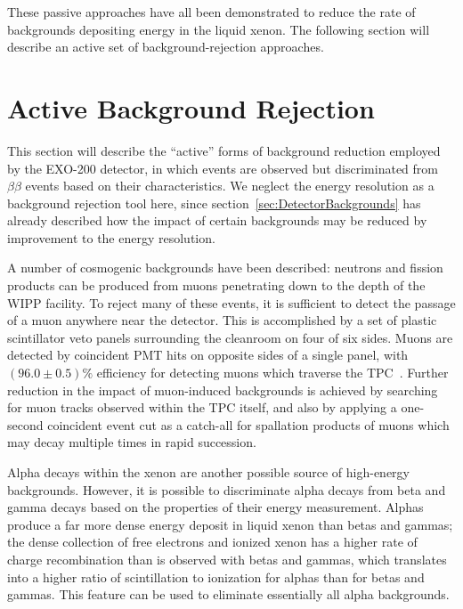 These passive approaches have all been demonstrated to reduce the rate of backgrounds depositing energy in the liquid xenon.  The following section will describe an active set of background-rejection approaches.

\section{Active Background Rejection}\label{sec:DetectorActiveBackgroundRejection}

This section will describe the ``active'' forms of background reduction employed by the EXO-200 detector, in which events are observed but discriminated from $\beta\beta$ events based on their characteristics.  We neglect the energy resolution as a background rejection tool here, since section~\ref{sec:DetectorBackgrounds} has already described how the impact of certain backgrounds may be reduced by improvement to the energy resolution.

A number of cosmogenic backgrounds have been described: neutrons and fission products can be produced from muons penetrating down to the depth of the WIPP facility.  To reject many of these events, it is sufficient to detect the passage of a muon anywhere near the detector.  This is accomplished by a set of plastic scintillator veto panels surrounding the cleanroom on four of six sides.  Muons are detected by coincident PMT hits on opposite sides of a single panel, with $(96.0 \pm 0.5)\%$ efficiency for detecting muons which traverse the TPC~\cite{detectorPartI}.  Further reduction in the impact of muon-induced backgrounds is achieved by searching for muon tracks observed within the TPC itself, and also by applying a one-second coincident event cut as a catch-all for spallation products of muons which may decay multiple times in rapid succession.

Alpha decays within the xenon are another possible source of high-energy backgrounds.  However, it is possible to discriminate alpha decays from beta and gamma decays based on the properties of their energy measurement.  Alphas produce a far more dense energy deposit in liquid xenon than betas and gammas; the dense collection of free electrons and ionized xenon has a higher rate of charge recombination than is observed with betas and gammas, which translates into a higher ratio of scintillation to ionization for alphas than for betas and gammas.  This feature can be used to eliminate essentially all alpha backgrounds.

